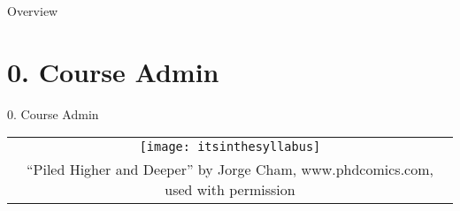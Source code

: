 \begin{frame}
  \maketitle
\end{frame}

\begin{frame}{Overview}
\tableofcontents[pausesections]
\end{frame}

\section{0. Course Admin}
\begin{frame}{0. Course Admin}

	\begin{center}
		\begin{tabular}{c}
		\texttt{[image: itsinthesyllabus]}\\
		{\tiny \textcopyright ``Piled Higher and Deeper'' by Jorge Cham,
www.phdcomics.com, used with permission}
		\end{tabular}
	\end{center}

\end{frame}

